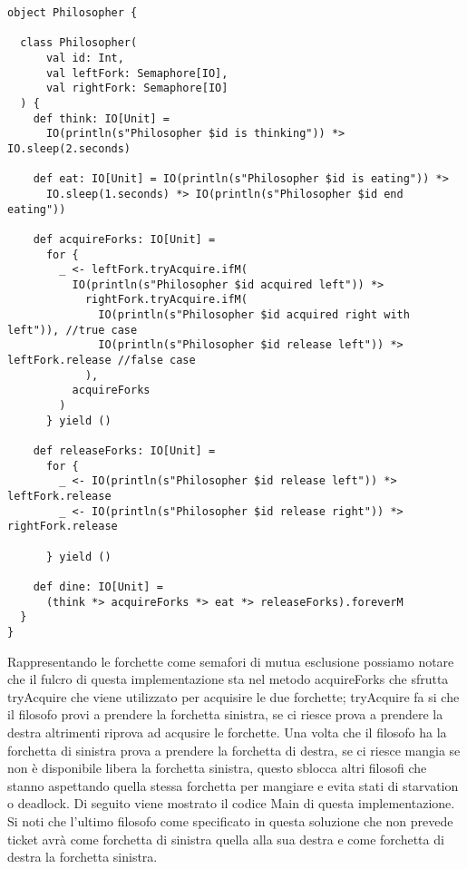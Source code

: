\begin{verbatim}
object Philosopher {

  class Philosopher(
      val id: Int,
      val leftFork: Semaphore[IO],
      val rightFork: Semaphore[IO]
  ) {
    def think: IO[Unit] =
      IO(println(s"Philosopher $id is thinking")) *> IO.sleep(2.seconds)

    def eat: IO[Unit] = IO(println(s"Philosopher $id is eating")) *>
      IO.sleep(1.seconds) *> IO(println(s"Philosopher $id end eating"))

    def acquireForks: IO[Unit] =
      for {
        _ <- leftFork.tryAcquire.ifM(
          IO(println(s"Philosopher $id acquired left")) *>
            rightFork.tryAcquire.ifM(
              IO(println(s"Philosopher $id acquired right with left")), //true case
              IO(println(s"Philosopher $id release left")) *> leftFork.release //false case
            ),
          acquireForks
        )
      } yield ()

    def releaseForks: IO[Unit] =
      for {
        _ <- IO(println(s"Philosopher $id release left")) *> leftFork.release
        _ <- IO(println(s"Philosopher $id release right")) *> rightFork.release

      } yield ()

    def dine: IO[Unit] =
      (think *> acquireForks *> eat *> releaseForks).foreverM
  }
}
\end{verbatim}

\noindent Rappresentando le forchette come semafori di mutua esclusione possiamo notare che il fulcro di questa implementazione sta nel metodo acquireForks che sfrutta tryAcquire che viene utilizzato per acquisire le due forchette; tryAcquire fa si che il filosofo provi a prendere la forchetta sinistra, se ci riesce prova a prendere la destra altrimenti riprova ad acqusire le forchette. Una volta che il filosofo ha la forchetta di sinistra prova a prendere la forchetta di destra, se ci riesce mangia se non è disponibile libera la forchetta sinistra, questo sblocca altri filosofi che stanno aspettando quella stessa forchetta per mangiare e evita stati di starvation o deadlock. Di seguito viene mostrato il codice Main di questa implementazione. Si noti che l'ultimo filosofo come specificato in questa soluzione che non prevede ticket avrà come forchetta di sinistra quella alla sua destra e come forchetta di destra la forchetta sinistra. 


